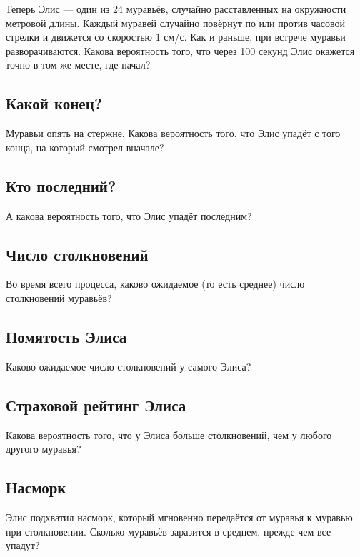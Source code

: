 Теперь Элис --- один из 24 муравьёв, случайно расставленных на окружности метровой длины.
Каждый муравей случайно повёрнут по или против часовой стрелки и движется со скоростью 1 см/с.
Как и раньше, при встрече муравьи разворачиваются.
Какова вероятность того, что через 100 секунд Элис окажется точно в том же месте, где начал?

\subsection*{Какой конец?}

Муравьи опять на стержне.
Какова вероятность того, что Элис упадёт с того конца, на который смотрел вначале?

\subsection*{Кто последний?}

А какова вероятность того, что Элис упадёт последним?

\subsection*{Число столкновений}

Во время всего процесса, каково ожидаемое (то есть среднее) число столкновений муравьёв?

\subsection*{Помятость Элиса}

Каково ожидаемое число столкновений у самого Элиса?

\subsection*{Страховой рейтинг Элиса}

Какова вероятность того, что у Элиса больше столкновений, чем у любого другого муравья?

\subsection*{Насморк}

Элис подхватил насморк, который мгновенно передаётся от муравья к муравью при столкновении. Сколько муравьёв заразится в среднем, прежде чем все упадут?

